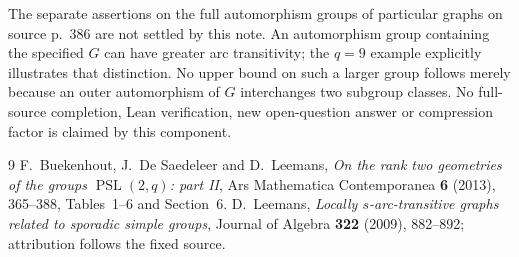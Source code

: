 \documentclass[11pt]{article}
\newcommand{\PSL}{\operatorname{PSL}}
\begin{document}
The separate assertions on the full automorphism groups of particular
graphs on source p.~386 are not settled by this note. An automorphism
group containing the specified $G$ can have greater arc transitivity;
the $q=9$ example explicitly illustrates that distinction. No upper
bound on such a larger group follows merely because an outer automorphism
of $G$ interchanges two subgroup classes. No full-source completion,
Lean verification, new open-question answer or compression factor is
claimed by this component.

\begin{thebibliography}{9}
 F.~Buekenhout, J.~De Saedeleer and D.~Leemans,
\emph{On the rank two geometries of the groups $\PSL(2,q)$: part II},
Ars Mathematica Contemporanea \textbf{6} (2013), 365--388,
Tables~1--6 and Section~6.
 D.~Leemans, \emph{Locally $s$-arc-transitive graphs
related to sporadic simple groups}, Journal of Algebra \textbf{322}
(2009), 882--892; attribution follows the fixed source.
\end{thebibliography}
\end{document}
